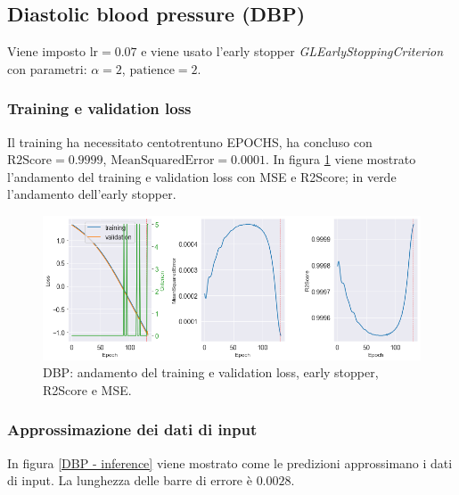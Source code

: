 \newpage
\subsection{Diastolic blood pressure (DBP)}
Viene imposto $\text{lr}=0.07$ e viene usato l'early stopper \textit{GLEarlyStoppingCriterion} con parametri: $\alpha = 2$, $\text{patience}=2$.



\subsubsection{Training e validation loss}
Il training ha necessitato centotrentuno EPOCHS, ha concluso con $\text{R2Score}=0.9999$, $\text{MeanSquaredError}=0.0001$. In figura \ref{DBP - loss} viene mostrato l'andamento del training e validation loss con MSE e R2Score; in verde l'andamento dell'early stopper.
\begin{figure}[h]
    \centering
    \includegraphics[width=1\textwidth]{images/Training (risultati)/DBP/DBP - loss.png}
    \caption{DBP: andamento del training e validation loss, early stopper, R2Score e MSE.}
    \label{DBP - loss}
\end{figure}

\vspace{-0.5cm}

\subsubsection{Approssimazione dei dati di input}
In figura \ref{DBP - inference} viene mostrato come le predizioni approssimano i dati di input. La lunghezza delle barre di errore è $0.0028$.

